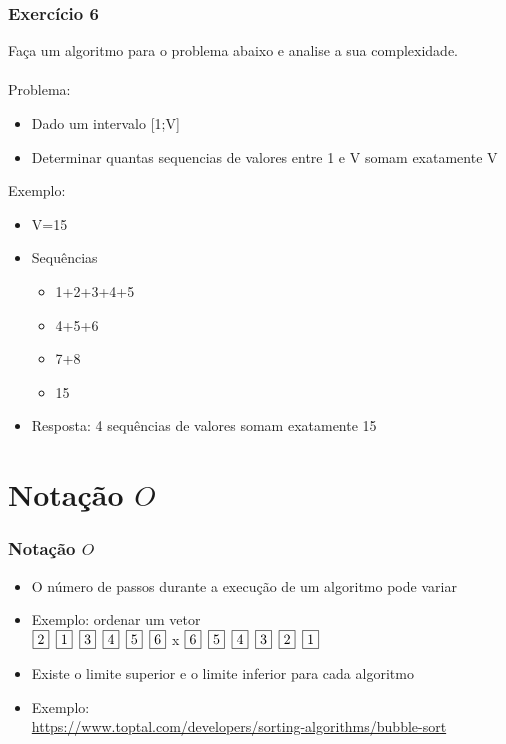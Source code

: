 \documentclass[aspectratio=169]{beamer}
\begin{document}
\begin{frame}\frametitle{Exercício 6}
Faça um algoritmo para o problema abaixo e analise a sua complexidade.\\
~\\
Problema:
\begin{itemize}
	\item Dado um intervalo [1;V]
	\item Determinar quantas sequencias de valores entre 1 e V somam exatamente V
\end{itemize}
Exemplo:
\begin{itemize}
	\item V=15
	\item Sequências
	\begin{itemize}
		\item 1+2+3+4+5
		\item 4+5+6
		\item 7+8
		\item 15
	\end{itemize}
	\item Resposta: 4 sequências de valores somam exatamente 15
\end{itemize}
\end{frame}

\section{Notação $O$}

\newcommand{\sep}{\hspace*{.5em}}
\begin{frame}\frametitle{Notação $O$}
\begin{itemize}
	\item O número de passos durante a execução de um algoritmo pode variar
	\item Exemplo: ordenar um vetor\\
\noindent $\fbox{2} \sep \fbox{1} \sep \fbox{3} \sep \fbox{4} \sep \fbox{5} \sep \fbox{6}$ \sep x \sep
          $\fbox{6} \sep \fbox{5} \sep \fbox{4} \sep \fbox{3} \sep \fbox{2} \sep \fbox{1}$
	\item Existe o limite superior e o limite inferior para cada algoritmo
	\item Exemplo:\\
\url{https://www.toptal.com/developers/sorting-algorithms/bubble-sort}
\end{itemize}
\end{frame}
\end{document}
